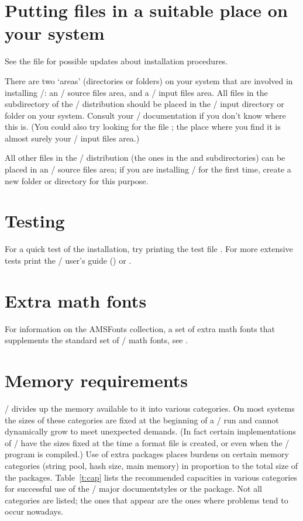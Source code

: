\documentclass[leqno,titlepage,openany]{amsldoc}
\newcommand{\ii}[1]{#1\index{#1}}
\begin{document}
\section{Putting files in a suitable place on your system}

See the  file for possible updates about \ii{installation}
procedures.

There are two `areas' (directories or folders) on your system that are
involved in installing \amslatex/: an \amslatex/ source files area,
and a \latex/ input files area. All files in the 
subdirectory of the \amslatex/ distribution should be placed in the
\latex/ input directory or folder on your system. Consult your \tex/
documentation if you don't know where this is. (You could also try
looking for the file ; the place where you find it is
almost surely your \latex/ input files area.)

All other files in the \amslatex/ distribution (the ones in the
 and  subdirectories) can be placed in an
\amslatex/ source files area; if you are installing \amslatex/ for the
first time, create a new folder or directory for this purpose.

\section{Testing}

For a quick test of the installation, try printing the test file
. For more extensive tests print the \amslatex/ user's
guide ()
or .

\section{Extra math fonts}

For information on the AMSFonts collection, a set of extra math
fonts that supplements the standard set of \latex/ math fonts,
see .

\section{Memory requirements}
\label{as:capacity}

\tex/ divides up the memory available to it into various categories.
On most systems the sizes of these categories are fixed at the
beginning of a \tex/ run and cannot dynamically grow to meet
unexpected demands. (In fact certain implementations of \tex/ have the
sizes fixed at the time a format file is created, or even when the
\tex/ program is compiled.) Use of extra packages places burdens on
certain memory categories (string pool, hash size, main memory) in
proportion to the total size of the packages. Table~\ref{t:cap}
lists the recommended capacities in various categories for successful
use of the \amslatex/ major documentstyles or the 
package. Not all categories are listed; the ones that appear are the
ones where problems tend to occur nowadays.
\end{document}
